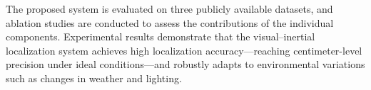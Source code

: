 \begin{abstract*}
  The proposed system is evaluated on three publicly available datasets, and ablation studies are conducted to assess the contributions of the individual components. Experimental results demonstrate that the visual–inertial localization system achieves high localization accuracy—reaching centimeter-level precision under ideal conditions—and robustly adapts to environmental variations such as changes in weather and lighting.

\end{abstract*}

